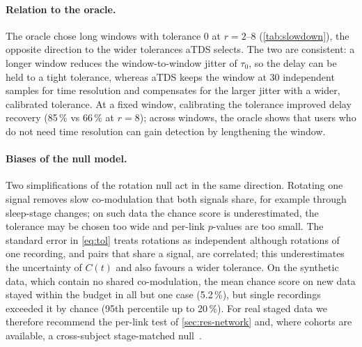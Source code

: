 \documentclass[11pt,a4paper]{article}
\begin{document}
\paragraph{Relation to the oracle.} The oracle chose long windows with tolerance 0 at $r = 2$--8 (\cref{tab:slowdown}), the opposite direction to the wider tolerances aTDS selects. The two are consistent: a longer window reduces the window-to-window jitter of $\tau_0$, so the delay can be held to a tight tolerance, whereas aTDS keeps the window at 30 independent samples for time resolution and compensates for the larger jitter with a wider, calibrated tolerance. At a fixed window, calibrating the tolerance improved delay recovery (85\,\% vs 66\,\% at $r = 8$); across windows, the oracle shows that users who do not need time resolution can gain detection by lengthening the window.

\paragraph{Biases of the null model.} Two simplifications of the rotation null act in the same direction. Rotating one signal removes slow co-modulation that both signals share, for example through sleep-stage changes; on such data the chance score is underestimated, the tolerance may be chosen too wide and per-link $p$-values are too small. The standard error in \cref{eq:tol} treats rotations as independent although rotations of one recording, and pairs that share a signal, are correlated; this underestimates the uncertainty of $C(t)$ and also favours a wider tolerance. On the synthetic data, which contain no shared co-modulation, the mean chance score on new data stayed within the budget in all but one case (5.2\,\%), but single recordings exceeded it by chance (95th percentile up to 20\,\%). For real staged data we therefore recommend the per-link test of \cref{sec:res-network} and, where cohorts are available, a cross-subject stage-matched null~\cite{Bashan2012NetworkPhysiology}.
\end{document}
